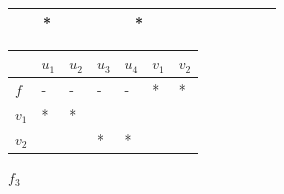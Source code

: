 \begin{longtable}[]{@{}llllllllllllllllll@{}}
\begin{minipage}[t]{0.06\columnwidth}
\strut
\end{minipage} & \begin{minipage}[t]{0.02\columnwidth}\raggedright
\strut
\end{minipage} & \begin{minipage}[t]{0.06\columnwidth}\raggedright
*\strut
\end{minipage} & \begin{minipage}[t]{0.02\columnwidth}\raggedright
\strut
\end{minipage} & \begin{minipage}[t]{0.06\columnwidth}\raggedright
\strut
\end{minipage} & \begin{minipage}[t]{0.02\columnwidth}\raggedright
\strut
\end{minipage} & \begin{minipage}[t]{0.06\columnwidth}\raggedright
\strut
\end{minipage} & \begin{minipage}[t]{0.02\columnwidth}\raggedright
\strut
\end{minipage} & \begin{minipage}[t]{0.02\columnwidth}\raggedright
*\strut
\end{minipage} & \begin{minipage}[t]{0.02\columnwidth}\raggedright
\strut
\end{minipage} & \begin{minipage}[t]{0.02\columnwidth}\raggedright
\strut
\end{minipage} & \begin{minipage}[t]{0.02\columnwidth}\raggedright
\strut
\end{minipage} & \begin{minipage}[t]{0.02\columnwidth}\raggedright
\strut
\end{minipage} & \begin{minipage}[t]{0.02\columnwidth}\raggedright
\strut
\end{minipage}\tabularnewline
\bottomrule
\end{longtable}

\begin{longtable}[]{@{}lllllll@{}}
\toprule
& \(u_1\) & \(u_2\) & \(u_3\) & \(u_4\) & \(v_1\) &
\(v_2\)\tabularnewline
\midrule
\endhead
\(f\) & - & - & - & - & * & *\tabularnewline
\(v_1\) & * & * & & & &\tabularnewline
\(v_2\) & & & * & * & &\tabularnewline
\bottomrule
\end{longtable}

\(f_3\)

